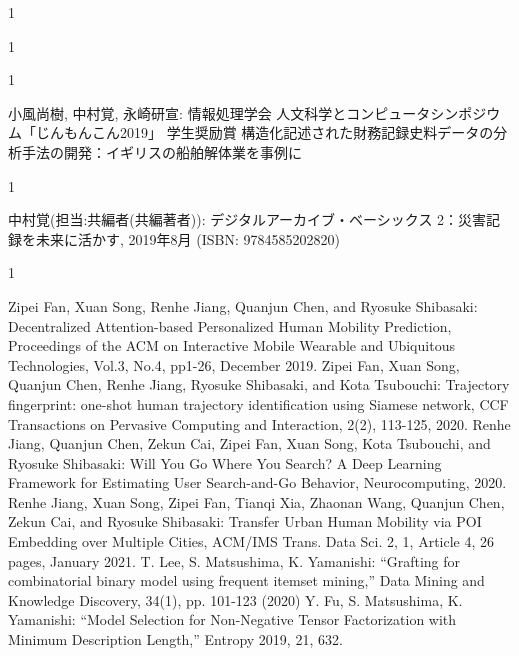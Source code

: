 \begin{招待講演}{1}


\end{招待講演}

\begin{招待論文}{1}


\end{招待論文}

\begin{受賞}{1}

小風尚樹, 中村覚, 永崎研宣:
 情報処理学会 人文科学とコンピュータシンポジウム「じんもんこん2019」 学生奨励賞 構造化記述された財務記録史料データの分析手法の開発：イギリスの船舶解体業を事例に
\end{受賞}

\begin{著書}{1}

中村覚(担当:共編者(共編著者)):
 デジタルアーカイブ・ベーシックス 2：災害記録を未来に活かす, 2019年8月 (ISBN: 9784585202820)
\end{著書}

\begin{雑誌論文}{1}

Zipei Fan, Xuan Song, Renhe Jiang, Quanjun Chen, and Ryosuke Shibasaki:
Decentralized Attention-based Personalized Human Mobility Prediction, Proceedings of the ACM on Interactive Mobile Wearable and Ubiquitous Technologies, Vol.3, No.4, pp1-26, December 2019.
Zipei Fan, Xuan Song, Quanjun Chen, Renhe Jiang, Ryosuke Shibasaki, and Kota Tsubouchi:  
Trajectory fingerprint: one-shot human trajectory identification using Siamese network, CCF Transactions on Pervasive Computing and Interaction, 2(2), 113-125, 2020.
Renhe Jiang, Quanjun Chen, Zekun Cai, Zipei Fan, Xuan Song, Kota Tsubouchi, and Ryosuke Shibasaki: 
Will You Go Where You Search? A Deep Learning Framework for Estimating User Search-and-Go Behavior, Neurocomputing, 2020.
Renhe Jiang, Xuan Song, Zipei Fan, Tianqi Xia, Zhaonan Wang, Quanjun Chen, Zekun Cai, and Ryosuke Shibasaki: 
Transfer Urban Human Mobility via POI Embedding over Multiple Cities, ACM/IMS Trans. Data Sci. 2, 1, Article 4, 26 pages, January 2021.
T. Lee, S. Matsushima, K. Yamanishi: “Grafting for combinatorial binary model using frequent itemset mining,” Data Mining and Knowledge Discovery, 34(1), pp. 101-123 (2020)
Y. Fu, S. Matsushima, K. Yamanishi: “Model Selection for Non-Negative Tensor Factorization with Minimum Description Length,” Entropy 2019, 21, 632.
	
\end{雑誌論文}

